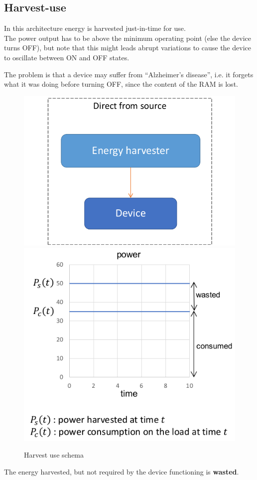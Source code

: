 \subsection{Harvest-use}
\begin{paracol}{2}

   In this architecture energy is harvested just-in-time for use.\\
   The power output has to be above the minimum operating point (else the device turns OFF), 
   but note that this might leads abrupt variations to cause the device to oscillate between ON and OFF states.
   
   The problem is that a device may suffer from ``Alzheimer's disease'', i.e. it forgets what it was doing before turning OFF, since the content of the RAM is lost.
   
   \switchcolumn
   
   \begin{figure}[htbp]
      \centering
      \includegraphics[width=0.45\columnwidth]{images/harvestuse1.png}
      \includegraphics[width=0.45\columnwidth]{images/harvestuse2.png}
      \caption{Harvest use schema}
      \label{fig:harvestuse}
   \end{figure}
\end{paracol}

The energy harvested, but not required by the device functioning is \textbf{wasted}.

